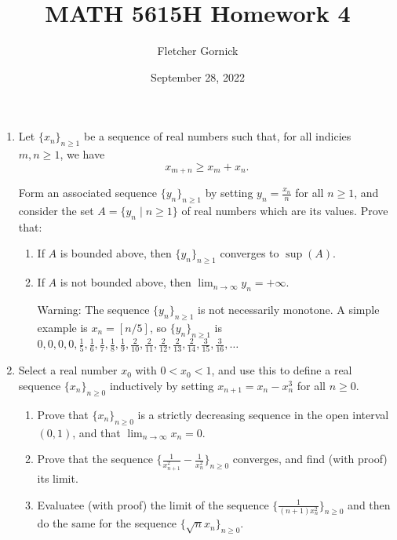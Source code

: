 \documentclass[11pt]{article}
\title{\vspace{-1.0cm}MATH 5615H Homework 4}
\author{Fletcher Gornick}
\date{September 28, 2022}
\begin{document}
 \maketitle
 \begin{enumerate}[leftmargin=0pt, label=\arabic*)]
   \item Let \(\{x_n\}_{n \geq 1}\) be a sequence of real numbers such that, for all indicies \(m, n \geq 1\), we have 
     \[x_{m+n} \geq x_m + x_n.\]

     Form an associated sequence \(\{y_n\}_{n \geq 1}\) by setting \(y_n = \frac{x_n}{n}\) for all \(n \geq 1\), and consider the set 
     \(A = \{y_n \;|\; n \geq 1\}\) of real numbers which are its values.  Prove that:
     \begin{enumerate}[label=(\roman*)]
       \item If \(A\) is bounded above, then \(\{y_n\}_{n \geq 1}\) converges to \(\sup(A)\).

       \item If \(A\) is not bounded above, then \(\displaystyle\lim_{n \to \infty} y_n = +\infty\).  

         Warning: The sequence \(\{y_n\}_{n \geq 1}\) is not necessarily monotone.  A simple example is \(x_n = [n/5]\), so
         \(\{y_n\}_{n \geq 1}\) is \(0,0,0,0,\frac{1}{5}, \frac{1}{6}, \frac{1}{7}, \frac{1}{8}, \frac{1}{9}, \frac{2}{10},
         \frac{2}{11}, \frac{2}{12}, \frac{2}{13}, \frac{2}{14}, \frac{3}{15}, \frac{3}{16}, \dots\)
     \end{enumerate}
     \newpage
     
   \item Select a real number \(x_0\) with \(0 < x_0 < 1\), and use this to define a real sequence \(\{x_n\}_{n \geq 0}\) 
     inductively by setting \(x_{n+1} = x_n - x_n^3\) for all \(n \geq 0\).
     \begin{enumerate}[label=(\roman*)]
       \item Prove that \(\{x_n\}_{n \geq 0}\) is a strictly decreasing sequence in the open interval \((0,1)\), and that 
         \(\displaystyle\lim_{n \to \infty} x_n = 0\).

       \item Prove that the sequence \(\Big\{\frac{1}{x_{n+1}^2} - \frac{1}{x_n^2}\Big\}_{n \geq 0}\) converges, and find (with 
         proof) its limit.
         
       \item Evaluatee (with proof) the limit of the sequence \(\Big\{\frac{1}{(n+1)x_n^2}\Big\}_{n \geq 0}\) and then do the 
         same for the sequence \(\{\sqrt{n}x_n\}_{n \geq 0}\).


\end{enumerate}
\end{enumerate}
\end{document}
